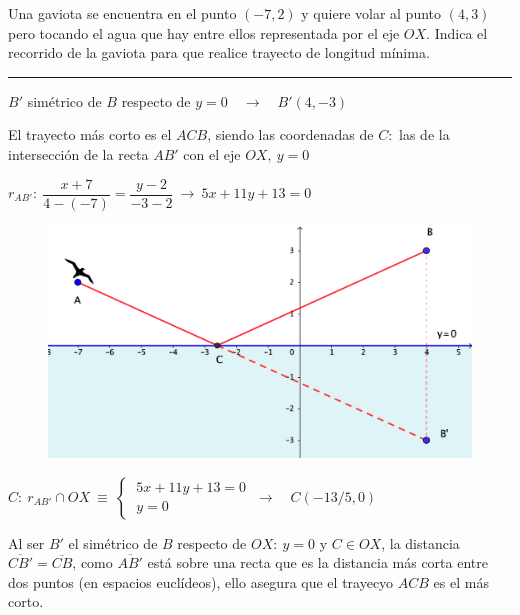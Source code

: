 \begin{miejercicio}

Una gaviota se encuentra en el punto $(-7,2)$ y quiere volar al punto $(4,3)$ pero tocando el agua que hay entre ellos representada por el eje $OX$. Indica el recorrido de la gaviota para que realice trayecto de longitud mínima.

\rule{250pt}{0.1pt}

\begin{multicols}{2}
\vspace{2mm} $B'$ simétrico de $B$ respecto de $y=0 \quad \to \quad B'(4,-3)$

\vspace{2mm} El trayecto más corto es el $ACB$, siendo las coordenadas de $C:$ las de la intersección de la recta $AB'$ con el eje $OX,\ y=0$

\vspace{2mm} $r_{AB'}: \ \dfrac{x+7}{4-(-7)}=\dfrac{y-2}{-3-2} \ \to \ 5x+11y+13=0$

\begin{figure}[H]
	\centering
	\includegraphics[width=.5\textwidth]{img-ga/ga31.png}
\end{figure}	
\end{multicols}
$C:\ r_{AB'} \cap OX \ \equiv \ \begin{cases} \ 5x+11y+13=0 \\ \ y=0 \end{cases} \ \to \quad C(-13/5,0)$

\vspace{2mm} Al ser $B'$ el simétrico de $B$ respecto de $OX:\ y=0$ y $C\in OX$, la distancia $\overline{CB'}=\overline{CB}$, como $\overline{AB'}$ está sobre una recta que es la distancia más corta entre dos puntos \textcolor{gris}{(en espacios euclídeos)}, ello asegura que el trayecyo $ACB$ es el más corto.

\end{miejercicio}


